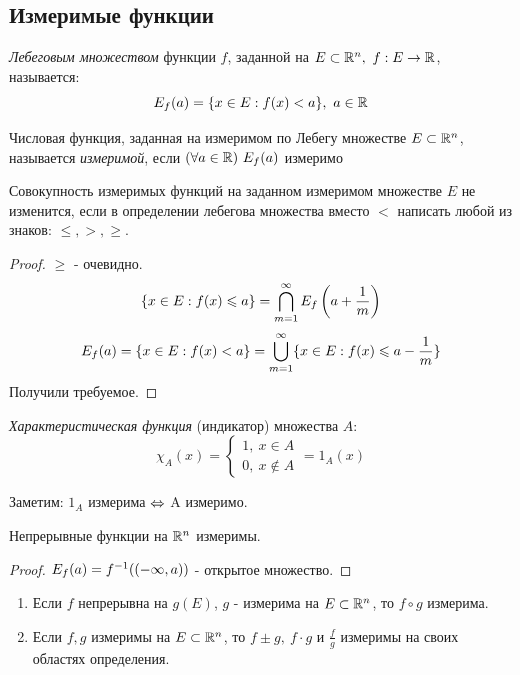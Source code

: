 \subsection{Измеримые функции}
\begin{definition}
	\textit{Лебеговым множеством} функции $f$, заданной на $E\subset\mathbb{R}^n,\ f:E\rightarrow \mathbb{R}$, называется:
	\[E_f(a)=\{x\in E:f(x)<a\},\ a\in\R\]
\end{definition}
\begin{definition}
	Числовая функция, заданная на измеримом по Лебегу множестве $E\subset\mathbb{R}^n$, называется \textit{измеримой}, если $(\fa a\in\R)\ E_f(a)$ измеримо
\end{definition}
\begin{theorem}
	Совокупность измеримых функций на заданном измеримом множестве $E$ не изменится, если в определении лебегова множества вместо $<$ написать любой из знаков: $\le,>,\ge$.
\end{theorem}
\begin{proof}
	$\ge$ - очевидно.
	\[\{x\in E:f(x)\leqslant a\}=\bigcap_{m=1}^\infty E_f\left(a+\frac1m\right)\]
	\[E_f(a)=\{x\in E:f(x)<a\}=\bigcup_{m=1}^\infty\{x\in E:f(x)\leqslant a-\frac1m\}\]
	Получили требуемое.
\end{proof}
\begin{definition}
	\textit{Характеристическая функция} (индикатор) множества $A$:
	\[
	\chi_A(x)=
	\begin{cases}
		1,\ x\in A\\
		0,\ x\notin A
	\end{cases}
	=1_A(x)
	\]
\end{definition}
\begin{note}
	Заметим: $1_A$ измерима $\Leftrightarrow$ A измеримо.
\end{note}
\begin{note}
	Непрерывные функции на $\mathbb{R}^n$ измеримы.
\end{note}
\begin{proof}
	$E_f(a)=f^{-1}((-\infty,a))$ - открытое множество.
\end{proof}
\begin{theorem}\label{23_th2}
	\begin{enumerate}
		\item Если $f$ непрерывна на $g(E)$, $g$ - измерима на $E\subset\mathbb{R}^n$, то $f\circ g$ измерима.
		\item Если $f,g$ измеримы на $E\subset\mathbb{R}^n$, то $f\pm g,\ f\cdot g$ и $\frac fg$ измеримы на своих областях определения.
	\end{enumerate}
\end{theorem}
